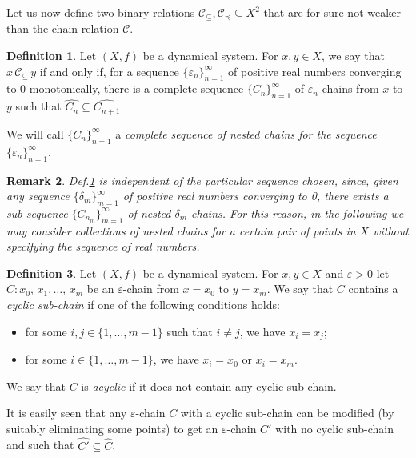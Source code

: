 \documentclass[10pt,a4paper]{article}
\theoremstyle{definition}
\newtheorem{defi}{Definition}[section]
\theoremstyle{remark}
\theoremstyle{plain}
\newtheorem{rem}[defi]{Remark}
\begin{document}
Let us now define two binary relations $\mathcal{C}_\subseteq,\mathcal{C}_\preceq\subseteq X^2$ that are for sure not weaker than the chain relation $\mathcal{C}$.

\begin{defi}\label{nested}
    Let $(X,f)$ be a dynamical system. For $x,y\in X$, we say that $x\,\mathcal{C}_\subseteq\, y$ if and only if, for a sequence $\{\varepsilon_n\}_{n=1}^\infty$ of positive real numbers converging to 0 monotonically, there is a complete sequence $\{C_n\}_{n=1}^\infty$ of $\varepsilon_n$-chains from $x$ to $y$ such that $\widehat{C_n}\subseteq \widehat{C_{n+1}}$.

    We will call $\{C_n\}_{n=1}^\infty$ a \textit{complete sequence of nested chains for the sequence $\{\varepsilon_n\}_{n=1}^\infty$}.
\end{defi}

\begin{rem}\label{canon}
    Def.\ref{nested} is independent of the particular sequence chosen, since, given any sequence $\{\delta_m\}_{m=1}^\infty$ of positive real numbers converging to 0, there exists a sub-sequence $\{C_{n_m}\}_{m=1}^\infty$ of nested $\delta_m$-chains. For this reason, in the following we may consider  collections of nested chains for a certain pair of points in $X$ without specifying the sequence of real numbers.
\end{rem}

\begin{defi}
    Let $(X,f)$ be a dynamical system.
    For $x,y\in X$ and $\varepsilon>0$ let $C:x_0,\,x_1,\dots,\,x_m$ be an $\varepsilon$-chain  from $x=x_0$ to $y=x_m$. We say that $C$ contains a \emph{cyclic sub-chain} if one of the following conditions holds:
    \begin{itemize}
        \item for some $i,j\in\{1,\dots,m-1\}$ such that $i\neq j$, we have $x_i=x_j$;
        \item for some $i\in\{1,\dots,m-1\}$, we have $x_i=x_0$ or $x_i=x_m$.
    \end{itemize}
    We say that $C$ is \emph{acyclic} if it does not contain any cyclic sub-chain.
\end{defi}

    It is easily seen that any $\varepsilon$-chain $C$ with a cyclic sub-chain can be modified (by suitably eliminating some points) to get an $\varepsilon$-chain $C'$ with no cyclic sub-chain and such that $\widehat{C'}\subseteq \widehat{C}$.
\end{document}
